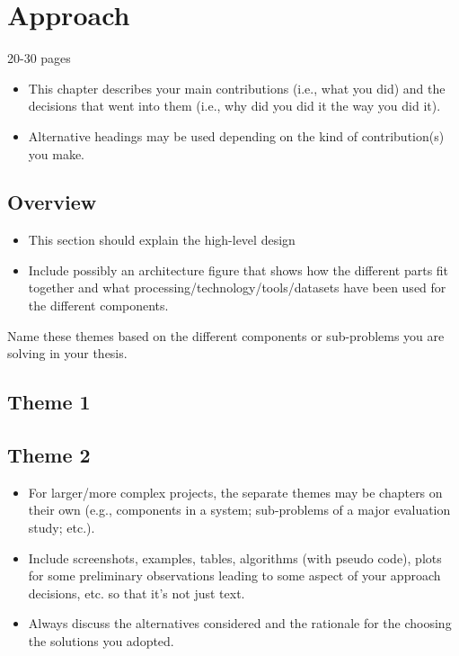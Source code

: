 \chapter{Approach}
\label{ch:approach}
20-30 pages
\begin{itemize}
    \item This chapter describes your main contributions (i.e., what you did) and the decisions that went into them (i.e., why did you did it the way you did it).
    \item Alternative headings may be used depending on the kind of contribution(s) you make.
\end{itemize}

\section{Overview}
\begin{itemize}
    \item This section should explain the high-level design
    \item Include possibly an architecture figure that shows how the different parts fit together and what processing/technology/tools/datasets have been used for the different components.
\end{itemize}
    
    Name these themes based on the different components or sub-problems you are solving in your thesis.
    
    \section{Theme 1}
    \section{Theme 2}
    
    \begin{itemize}
    \item For larger/more complex projects, the separate themes may be chapters on their own (e.g., components in a system; sub-problems of a major evaluation study; etc.).
    \item Include screenshots, examples, tables, algorithms (with pseudo code), plots for some preliminary observations leading to some aspect of your approach decisions, etc. so that it's not just text.
    \item Always discuss the alternatives considered and the rationale for the choosing the solutions you adopted.
\end{itemize}
    